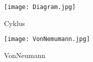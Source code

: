 \documentclass{article}
\begin{document}
\begin{figure}[!tbp]
  \centering
  \begin{minipage}[b]{0.4\textwidth}
    \texttt{[image: Diagram.jpg]}
    \caption{Cyklus}
  \end{minipage}
  \hfill
  \begin{minipage}[b]{0.4\textwidth}
    \texttt{[image: VonNemumann.jpg]}
    \caption{VonNeumann}
  \end{minipage}
\end{figure}
\end{document}
